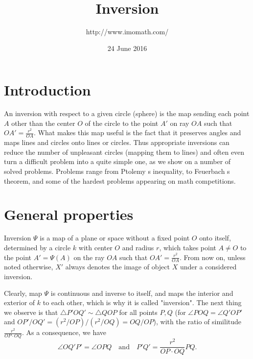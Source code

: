 \documentclass[11pt,a4paper]{article}
\begin{document}
\title{Inversion}
\author{http://www.imomath.com/}
\date{24 June 2016}
\maketitle

\section {Introduction}
An inversion with respect to a given circle (sphere) is the map sending each point $A$  other than the center $O$  of the circle to the point $A'$  on ray $OA$  such that $OA'=\frac{r^2}{OA}$. What makes this map useful is the fact that it preserves angles and maps lines and circles onto lines or circles. Thus appropriate inversions can reduce the number of unpleasant circles (mapping them to lines) and often even turn a difficult problem into a quite simple one, as we show on a number of solved problems. Problems range from Ptolemy s inequality, to Feuerbach s theorem, and some of the hardest problems appearing on math competitions. 

\section {General properties}
Inversion $\Psi$ is a map of a plane or space without a fixed point $O$ onto itself, determined by a circle $k$ with center $O$  and radius $r$, which takes point $A\ne O$ to the point $A'=\Psi(A)$ on the ray $OA$  such that $OA'=\frac{r^2}{OA}$. From now on, unless noted otherwise, $X'$ always denotes the image of object $X$ under a considered inversion.

Clearly, map $\Psi$ is continuous and inverse to itself, and maps the interior and exterior of $k$ to each other, which is why it is called "inversion". The next thing we observe is that $\triangle P'OQ'\sim\triangle QOP$ for all points $P, Q$  (for $\angle POQ=\angle Q'OP'$  and $OP\prime /OQ\prime =(r^2/OP)/(r^2/OQ)=
OQ/OP$), with the ratio of similitude $\frac{r^2}{OP\cdot OQ}$. As a consequence, we have $$\angle OQ\prime P\prime = \angle OPQ\quad\mbox{and}
\quad P\prime Q\prime = \frac{r^2}{OP\cdot OQ}PQ.$$
\end{document}
